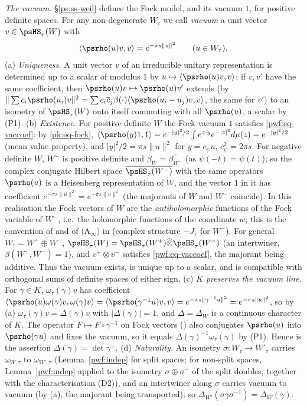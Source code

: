 \documentclass[10pt]{amsart}
\theoremstyle{definition}
\theoremstyle{remark}
\providecommand{\aubar}[1]{\overline{#1}}
\begin{document}
\emph{The vacuum.} \S\ref{ps:ss-weil} defines the Fock model, and its vacuum $1$, for positive
definite spaces. For any non-degenerate $W_\tau$ we call \emph{vacuum} a unit vector $v\in\psHS_\tau(W)$
with
\begin{equation}\label{pwf:eq-vaccoef}
\langle\psrho(u)v,v\rangle=e^{-\pi s\|u\|^2}\qquad(u\in W_\tau).
\end{equation}
(a) \emph{Uniqueness.} A unit vector $v$ of an irreducible unitary representation is determined up
to a scalar of modulus $1$ by $u\mapsto\langle\psrho(u)v,v\rangle$: if $v,v'$ have the same coefficient,
then $\psrho(u)v\mapsto\psrho(u)v'$ extends (by $\|\sum c_i\psrho(u_i)v\|^2=\sum c_i\aubar c_j\beta(\cdot)
\langle\psrho(u_i-u_j)v,v\rangle$, the same for $v'$) to an isometry of $\psHS_\tau(W)$ onto itself
commuting with all $\psrho(u)$, a scalar by (P1).
(b) \emph{Existence.} For positive definite $W$ the Fock vacuum $1$ satisfies \eqref{pwf:eq-vaccoef}:
by \eqref{pk:eq-fock}, $\langle\psrho(y)1,1\rangle=e^{-|y|^2/2}\int e^{z\cdot y}e^{-|z|^2}d\mu(z)=e^{-|y|^2/2}$
(mean value property), and $|y|^2/2=\pi s\|u\|^2$ for $y=c_\psi u$, $c_\psi^2=2\pi s$. For negative
definite $W$, $W^-$ is positive definite and $\beta_W=\aubar{\beta_{W^-}}$ (as $\psi(-t)=\aubar{\psi(t)}$);
so the complex conjugate Hilbert space $\aubar{\psHS_\tau(W^-)}$ with the same operators $\psrho(u)$ is a
Heisenberg representation of $W$, and the vector $1$ in it has coefficient $\aubar{e^{-\pi s\|u\|^2}}=
e^{-\pi s\|u\|^2}$ (the majorants of $W$ and $W^-$ coincide). In this realisation the Fock vectors of
$W$ are the \emph{antiholomorphic} functions of the Fock variable of $W^-$, i.e.\ the holomorphic
functions of the coordinate $w$; this is the convention of {\cite[\S3.3.2]{P54}} and of (A$_\infty$) in
{\cite[\S3.3.1]{P54}} (complex structure $-J_\tau$ for $W^-$). For general $W_\tau=W^+\oplus W^-$, $\psHS_\tau(W)=\psHS_\tau(W^+)\widehat
\otimes\psHS_\tau(W^-)$ (an intertwiner, $\beta(W^+,W^-)=1$), and $v^+\otimes v^-$ satisfies
\eqref{pwf:eq-vaccoef}, the majorant being additive. Thus the vacuum exists, is unique up to a
scalar, and is compatible with orthogonal sums of definite spaces of either sign.
(c) \emph{$K$ preserves the vacuum line.} For $\gamma\in K$, $\omega_\tau(\gamma)v$ has coefficient
$\langle\psrho(u)\omega(\gamma)v,\omega(\gamma)v\rangle=\langle\psrho(\gamma^{-1}u)v,v\rangle=
e^{-\pi s\|\gamma^{-1}u\|^2}=e^{-\pi s\|u\|^2}$, so by (a) $\omega_\tau(\gamma)v=\Delta(\gamma)v$ with
$|\Delta(\gamma)|=1$, and $\Delta=\Delta_W$ is a continuous character of $K$. The operator $F\mapsto
F\circ\gamma^{-1}$ on Fock vectors ({\cite[\S3.3.2]{P54}}) also conjugates $\psrho(u)$ into $\psrho(\gamma u)$
and fixes the vacuum, so it equals $\Delta(\gamma)^{-1}\omega_\tau(\gamma)$ by (P1). Hence
{\cite[(30)]{P54}} is the assertion $\Delta(\gamma)=\aubar{\det\gamma^-}$.
(d) \emph{Naturality.} An isometry $\sigma\colon W_\tau\to W'_\tau$ carries $\omega_{W,\tau}$ to
$\omega_{W',\tau}$ (Lemma~\ref{pwf:indep} for split spaces; for non-split spaces, Lemma~\ref{pwf:indep} applied to the
isometry $\sigma\oplus\sigma^-$ of the split doubles, together with the characterisation (D2)), and
an intertwiner along $\sigma$ carries vacuum to vacuum (by (a), the majorant being transported); so
$\Delta_{W'}(\sigma\gamma\sigma^{-1})=\Delta_W(\gamma)$.
\end{document}

